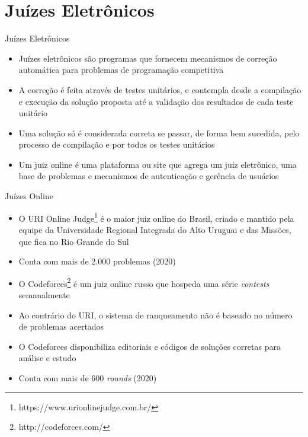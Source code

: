 \section{Juízes Eletrônicos}

\begin{frame}[fragile]{Juízes Eletrônicos}

    \begin{itemize}
        \item Juízes eletrônicos são programas que fornecem mecanismos de correção automática para 
        problemas de programação competitiva
        \item A correção é feita através de testes unitários, e contempla desde a compilação e 
        execução da solução proposta até a validação dos resultados de cada teste unitário
        \item Uma solução só é considerada correta se passar, de  forma  bem  sucedida,
        pelo  processo de  compilação  e por todos os testes unitários
        \item Um juiz online é uma plataforma ou site que agrega um juiz eletrônico, uma base de
        problemas e mecanismos de autenticação e gerência de usuários
    \end{itemize}

\end{frame}

\begin{frame}[fragile]{Juízes Online}

    \begin{itemize}
        \item O URI Online Judge\footnote{https://www.urionlinejudge.com.br/} 
        é o maior juiz online do Brasil, criado e mantido pela equipe
        da Universidade Regional Integrada do Alto Uruguai e das Missões, que fica no 
        Rio Grande do Sul
        \item Conta com mais de 2.000 problemas (2020)
        \item O Codeforces\footnote{http://codeforces.com/} é um juiz online russo que 
        hospeda uma série \textit{contests} semanalmente
        \item Ao contrário do URI, o sistema de ranqueamento não é baseado no número de problemas
        acertados
        \item O Codeforces disponibiliza editoriais e códigos de soluções corretas para análise e 
        estudo
        \item Conta com mais de 600 \textit{rounds} (2020)
   \end{itemize}

\end{frame}

